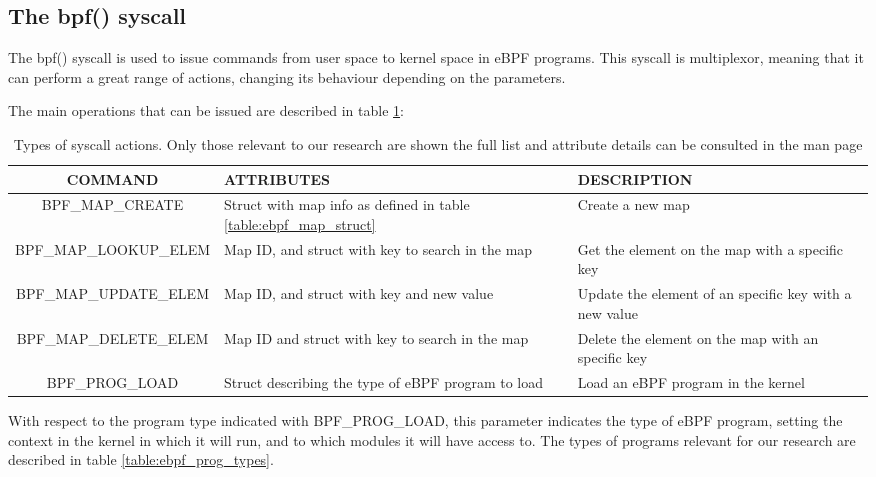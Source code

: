 
\subsection{The bpf() syscall} \label{subsection:bpf_syscall}
The bpf() syscall is used to issue commands from user space to kernel space in eBPF programs. This syscall is multiplexor, meaning that it can perform a great range of actions, changing its behaviour depending on the parameters.

The main operations that can be issued are described in table \ref{table:ebpf_syscall}:

\begin{table}[htbp]
\begin{tabular}{|c|>{\centering\arraybackslash}p{5cm}|>{\centering\arraybackslash}p{5cm}|}
\hline
COMMAND & ATTRIBUTES & DESCRIPTION\\
\hline
\hline
BPF\_MAP\_CREATE & Struct with map info as defined in table \ref{table:ebpf_map_struct} & Create a new map\\
\hline
BPF\_MAP\_LOOKUP\_ELEM & Map ID, and struct with key to search in the map & Get the element on the map with a specific key\\
\hline
BPF\_MAP\_UPDATE\_ELEM & Map ID, and struct with key and new value & Update the element of an specific key with a new value\\
\hline
BPF\_MAP\_DELETE\_ELEM & Map ID and struct with key to search in the map & Delete the element on the map with an specific key\\
\hline
BPF\_PROG\_LOAD & Struct describing the type of eBPF program to load & Load an eBPF program in the kernel\\
\hline
\end{tabular}
\caption{Types of syscall actions. Only those relevant to our research are shown the full list and attribute details can be consulted in the man page \cite{bpf_syscall}}
\label{table:ebpf_syscall}
\end{table}

With respect to the program type indicated with BPF\_PROG\_LOAD, this parameter indicates the type of eBPF program, setting the context in the kernel in which it will run, and to which modules it will have access to. The types of programs relevant for our research are described in table \ref{table:ebpf_prog_types}.

